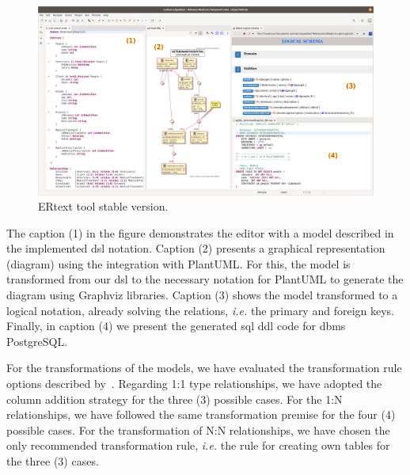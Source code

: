 \begin{figure} [!htb]
    \centering
    \caption{ERtext tool stable version.}
    \label{fig:stableVersion}
    \includegraphics[width=1\textwidth]{img/ToolOverview2.png}
\end{figure}

The caption (1) in the figure demonstrates the editor with a model described in the implemented \ac{dsl} notation.
Caption (2) presents a graphical representation (diagram) using the integration with PlantUML.
For this, the model is transformed from our \ac{dsl} to the necessary notation for PlantUML to generate the diagram using Graphviz libraries.
Caption (3) shows the model transformed to a logical notation, already solving the relations, \textit{i.e.} the primary and foreign keys.
Finally, in caption (4) we present the generated \ac{sql} \ac{ddl} code for \ac{dbms} PostgreSQL.

For the transformations of the models, we have evaluated the transformation rule options described by~\cite{Heuser:2009}.
Regarding 1:1 type relationships, we have adopted the column addition strategy for the three (3) possible cases.
For the 1:N relationships, we have followed the same transformation premise for the four (4) possible cases.
For the transformation of N:N relationships, we have chosen the only recommended transformation rule, \textit{i.e.} the rule for creating own tables for the three (3) cases.

